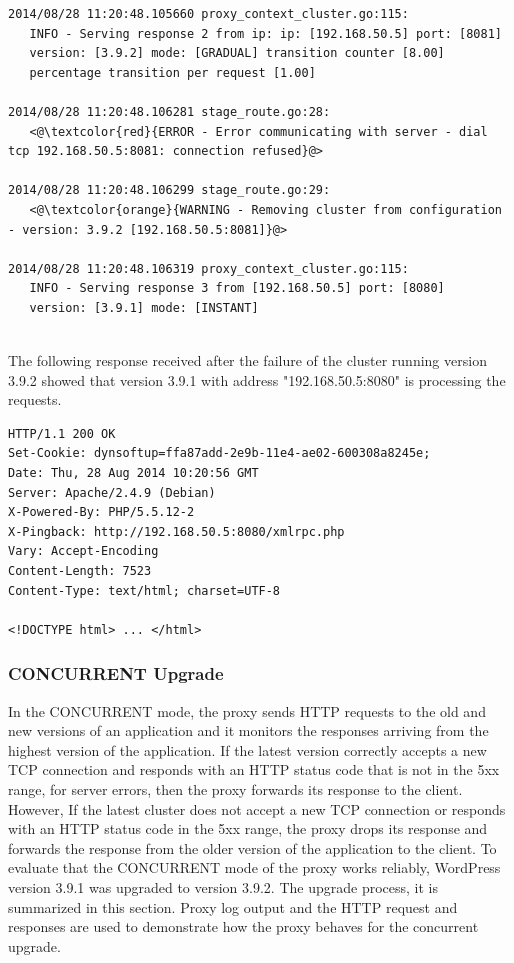 \documentclass[a4paper,11pt,twoside]{report}
\begin{document}
\begin{lstlisting}[language=terminal]
2014/08/28 11:20:48.105660 proxy_context_cluster.go:115:     
   INFO - Serving response 2 from ip: ip: [192.168.50.5] port: [8081] 
   version: [3.9.2] mode: [GRADUAL] transition counter [8.00] 
   percentage transition per request [1.00]
   
2014/08/28 11:20:48.106281 stage_route.go:28:    
   <@\textcolor{red}{ERROR - Error communicating with server - dial tcp 192.168.50.5:8081: connection refused}@>

2014/08/28 11:20:48.106299 stage_route.go:29:  
   <@\textcolor{orange}{WARNING - Removing cluster from configuration - version: 3.9.2 [192.168.50.5:8081]}@>

2014/08/28 11:20:48.106319 proxy_context_cluster.go:115:     
   INFO - Serving response 3 from [192.168.50.5] port: [8080] 
   version: [3.9.1] mode: [INSTANT]
\end{lstlisting}   

\noindent\\
The following response received after the failure of the cluster running version 3.9.2 showed that version 3.9.1 with address "192.168.50.5:8080" is processing the requests.\smallskip

\begin{lstlisting}[language=terminal]
HTTP/1.1 200 OK
Set-Cookie: dynsoftup=ffa87add-2e9b-11e4-ae02-600308a8245e;
Date: Thu, 28 Aug 2014 10:20:56 GMT
Server: Apache/2.4.9 (Debian)
X-Powered-By: PHP/5.5.12-2
X-Pingback: http://192.168.50.5:8080/xmlrpc.php
Vary: Accept-Encoding
Content-Length: 7523
Content-Type: text/html; charset=UTF-8
 
<!DOCTYPE html> ... </html>
\end{lstlisting}     

\subsubsection*{CONCURRENT Upgrade}
In the CONCURRENT mode, the proxy sends HTTP requests to the old and new versions of an application and it monitors the responses arriving from the highest version of the application. If the latest version correctly accepts a new TCP connection and responds with an HTTP status code that is not in the 5xx range, for server errors, then the proxy forwards its response to the client. However, If the latest cluster does not accept a new TCP connection or responds with an HTTP status code in the 5xx range, the proxy drops its response and forwards the response from the older version of the application to the client. To evaluate that the CONCURRENT mode of the proxy works reliably, WordPress version 3.9.1 was upgraded to version 3.9.2. The upgrade process, it is summarized in this section. Proxy log output and the HTTP request and responses are used to demonstrate how the proxy behaves for the concurrent upgrade.
\end{document}
